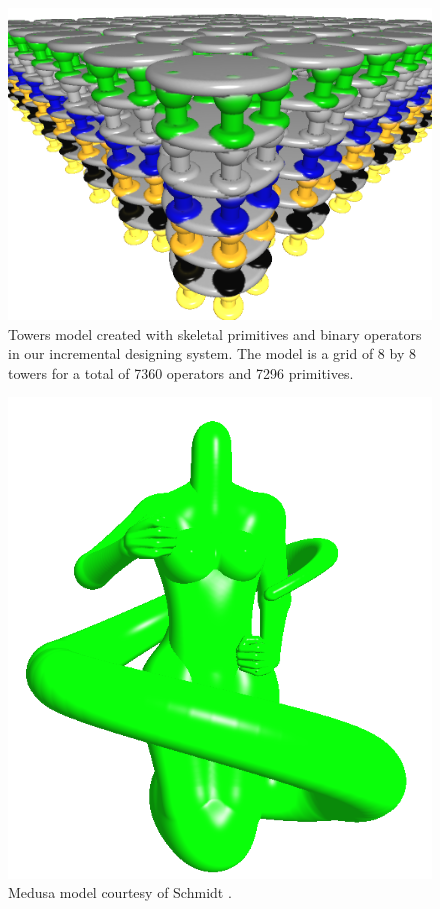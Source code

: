 \begin{figure}[htb]
  \centering
  \includegraphics[height = 0.8\linewidth]{figures/cpupoly/towers64}
  \caption{\label{fig:ModelTower}
  {Towers model created with skeletal primitives and binary operators in 
  our incremental designing system. The model is a grid of 8 by 8 towers for a total of
  7360 operators and 7296 primitives.}
}
\end{figure}

\begin{figure}[htb]
  \centering
  \includegraphics[width=0.7\linewidth]{figures/cpupoly/medusa}
  \caption{\label{fig:ModelMedusa}
  {Medusa model courtesy of Schmidt \etal \cite{SWG2005}.}
}
\end{figure}

